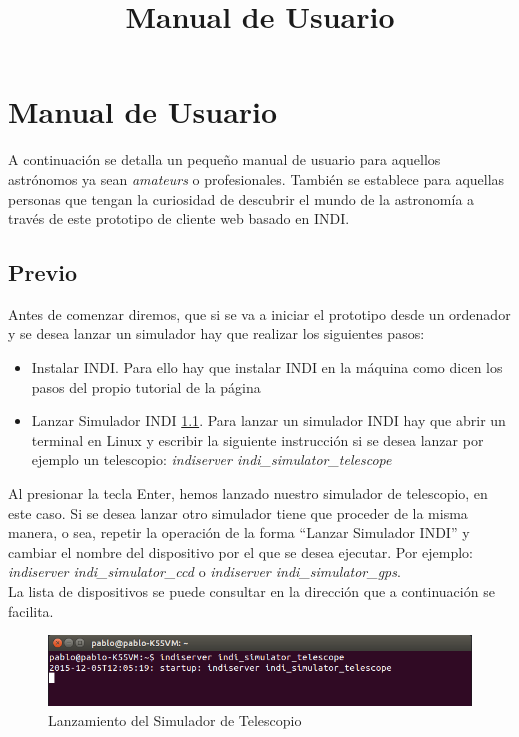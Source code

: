 \chapter{Manual de Usuario}
\title{Manual de Usuario}
\label{cap:ManualDeUsuario}

A continuación se detalla un pequeño manual de usuario para aquellos astrónomos ya sean  \textit{amateurs} o profesionales. También se establece para aquellas personas que tengan la curiosidad de descubrir el mundo de la astronomía a través de este prototipo de cliente web basado en INDI.

\section{Previo}
Antes de comenzar diremos, que si se va a iniciar el prototipo desde un ordenador y se desea lanzar un simulador hay que realizar los siguientes pasos:
\begin{itemize}
  \item Instalar INDI. Para ello hay que instalar INDI en la máquina como dicen los pasos del propio tutorial de la página\cite{InstalarINDI}
  \item Lanzar Simulador INDI \ref{fig:INDIServer}. Para lanzar un simulador INDI hay que abrir un terminal en Linux\cite{Linux} y escribir la siguiente instrucción si se desea lanzar por ejemplo un telescopio: \textit{indiserver indi\_simulator\_telescope}
\end{itemize}

Al presionar la tecla Enter, hemos lanzado nuestro simulador de telescopio, en este caso. Si se desea lanzar otro simulador tiene que proceder de la misma manera, o sea, repetir la operación de la forma “Lanzar Simulador INDI” y cambiar el nombre del dispositivo por el que se desea ejecutar. Por ejemplo: \textit{indiserver indi\_simulator\_ccd} o \textit{indiserver indi\_simulator\_gps}.\\

La lista de dispositivos se puede consultar en la dirección que a continuación se facilita.\cite{ListaDispositivos}

\begin{figure}[htb]
\centering
\includegraphics[width=1\textwidth]{./imagenes/capturaINDIServer}
\caption{Lanzamiento del Simulador de Telescopio} \label{fig:INDIServer}
\end{figure}

